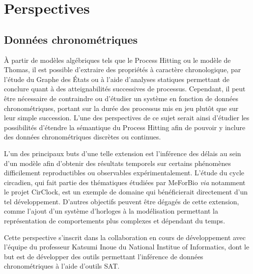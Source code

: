 \chapter{Perspectives}
\label{chap:perspectives}


\section{Données chronométriques}
À partir de modèles algébriques tels que le Process Hitting ou le modèle de Thomas, il est possible d'extraire des propriétés à caractère chronologique,
par l'étude du Graphe des États ou à l'aide d'analyses statiques permettant de conclure quant à des atteignabilités successives de processus.
Cependant, il peut être nécessaire de contraindre ou d'étudier un système en fonction de données chronométriques, portant sur la durée des processus mis en jeu plutôt que sur leur simple succession.
L'une des perspectives de ce sujet serait ainsi d'étudier les possibilités d'étendre la sémantique du Process Hitting afin de pouvoir y inclure des données chronométriques discrètes ou continues.

L'un des principaux buts d'une telle extension est l'inférence des délais au sein d'un modèle afin d'obtenir des résultats temporels sur certains phénomènes difficilement reproductibles ou observables expérimentalement.
L'étude du cycle circadien, qui fait partie des thématiques étudiées par MeForBio \textit{via} notamment le projet CirClock, est un exemple de domaine qui bénéficierait directement d'un tel développement.
D'autres objectifs peuvent être dégagés de cette extension, comme l'ajout d'un système d'horloges à la modélisation permettant la représentation de comportements plus complexes et dépendant du temps.

Cette perspective s'inscrit dans la collaboration en cours de développement avec l'équipe du professeur Katsumi Inoue du National Institue of Informatics,
dont le but est de développer des outils permettant l'inférence de données chronométriques à l'aide d'outils SAT.

